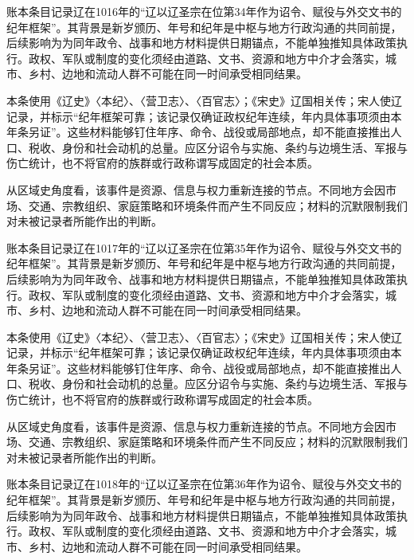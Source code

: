 账本条目记录辽在1016年的“辽以辽圣宗在位第34年作为诏令、赋役与外交文书的纪年框架”。其背景是新岁颁历、年号和纪年是中枢与地方行政沟通的共同前提，后续影响为为同年政令、战事和地方材料提供日期锚点，不能单独推知具体政策执行。政权、军队或制度的变化须经由道路、文书、资源和地方中介才会落实，城市、乡村、边地和流动人群不可能在同一时间承受相同结果。

本条使用《辽史》〈本纪〉、〈营卫志〉、〈百官志〉；《宋史》辽国相关传；宋人使辽记录，并标示“纪年框架可靠；该记录仅确证政权纪年连续，年内具体事项须由本年条另证”。这些材料能够钉住年序、命令、战役或局部地点，却不能直接推出人口、税收、身份和社会动机的总量。应区分诏令与实施、条约与边境生活、军报与伤亡统计，也不将官府的族群或行政称谓写成固定的社会本质。

从区域史角度看，该事件是资源、信息与权力重新连接的节点。不同地方会因市场、交通、宗教组织、家庭策略和环境条件而产生不同反应；材料的沉默限制我们对未被记录者所能作出的判断。

账本条目记录辽在1017年的“辽以辽圣宗在位第35年作为诏令、赋役与外交文书的纪年框架”。其背景是新岁颁历、年号和纪年是中枢与地方行政沟通的共同前提，后续影响为为同年政令、战事和地方材料提供日期锚点，不能单独推知具体政策执行。政权、军队或制度的变化须经由道路、文书、资源和地方中介才会落实，城市、乡村、边地和流动人群不可能在同一时间承受相同结果。

本条使用《辽史》〈本纪〉、〈营卫志〉、〈百官志〉；《宋史》辽国相关传；宋人使辽记录，并标示“纪年框架可靠；该记录仅确证政权纪年连续，年内具体事项须由本年条另证”。这些材料能够钉住年序、命令、战役或局部地点，却不能直接推出人口、税收、身份和社会动机的总量。应区分诏令与实施、条约与边境生活、军报与伤亡统计，也不将官府的族群或行政称谓写成固定的社会本质。

从区域史角度看，该事件是资源、信息与权力重新连接的节点。不同地方会因市场、交通、宗教组织、家庭策略和环境条件而产生不同反应；材料的沉默限制我们对未被记录者所能作出的判断。

账本条目记录辽在1018年的“辽以辽圣宗在位第36年作为诏令、赋役与外交文书的纪年框架”。其背景是新岁颁历、年号和纪年是中枢与地方行政沟通的共同前提，后续影响为为同年政令、战事和地方材料提供日期锚点，不能单独推知具体政策执行。政权、军队或制度的变化须经由道路、文书、资源和地方中介才会落实，城市、乡村、边地和流动人群不可能在同一时间承受相同结果。

